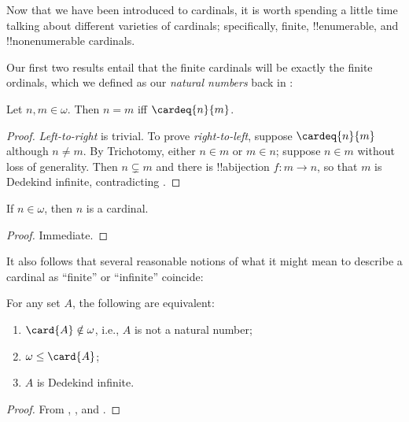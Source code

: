 \documentclass[../../../include/open-logic-section]{subfiles}
\begin{document}

Now that we have been introduced to cardinals, it is worth spending a
little time talking about different varieties of cardinals;
specifically, finite, !!{enumerable}, and !!{nonenumerable} cardinals.

Our first two results entail that the finite cardinals will be exactly
the finite ordinals, which we defined as our \emph{natural numbers}
back in : 

\begin{prop}
Let $n, m \in \omega$. Then $n = m$ iff $\cardeq{n}{m}$.
\end{prop}

\begin{proof}
\emph{Left-to-right} is trivial. To prove \emph{right-to-left},
suppose $\cardeq{n}{m}$ although $n \neq m$. By Trichotomy, either $n
\in m$ or $m \in n$; suppose $n \in m$ without loss of generality.
Then $n \subsetneq m$ and there is !!a{bijection} $f \colon m \to n$,
so that $m$ is Dedekind infinite, contradicting
.
\end{proof}

\begin{cor}
If $n \in \omega$, then $n$ is a cardinal. 
\end{cor}

\begin{proof}
Immediate.
\end{proof}

It also follows that several reasonable notions of what it might mean
to describe a cardinal as ``finite'' or ``infinite'' coincide:
\begin{thm}For any set $A$, the following are equivalent:
\begin{enumerate}
	\item{} $\card{A} \notin \omega$, i.e.,
	$A$ is not a natural number;
	\item{} $\omega \leq \card{A}$;
	\item{} $A$ is Dedekind infinite.
\end{enumerate}
\end{thm}

\begin{proof}
From ,
, and
. 
\end{proof}
\end{document}
